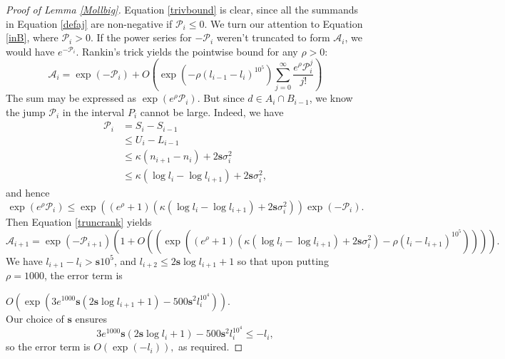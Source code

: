 \documentclass[12pt]{amsart}
\numberwithin{equation}{section}
\numberwithin{thm}{section}
\newcommand{\1}{\mathbf 1}
\begin{document}
\begin{proof}[Proof of Lemma \ref{Mollbig}]
	Equation \eqref{trivbound} is clear, since all the summands in Equation \eqref{defaj} are non-negative if $\mathscr{P}_{i}\le 0.$  We turn our attention to Equation \eqref{inB}, where $\mathscr{P}_i>0$. If the power series for $-\mathscr{P}_{i}$ weren't truncated to form $\mathscr{A}_{i}$, we would have $e^{-\mathscr{P}_{i}}$.  Rankin's trick yields the pointwise bound for any $\rho>0:$
	\begin{equation}\label{truncrank}
		\mathscr{A}_{i}=\exp(-\mathscr{P}_{i})+O\left(\exp\left(-\rho (l_{i-1}-l_i)^{10^5}\right)\sum^\infty_{j=0} \frac{e^\rho \mathscr{P}_{i}^j}{j!}\right)
		\end{equation}
		The sum may be expressed as $\exp\left(e^\rho \mathscr{P}_{i}\right)$. But since $d\in A_{i}\cap B_{i-1}$, we know the jump $\mathscr{P}_{i}$ in the interval $P_{i}$ cannot be large. Indeed, we  have \begin{align}\nonumber\mathscr{P}_{i}&= S_{i}-S_{{i-1}}\\&\le U_{i}-L_{i-1}\nonumber\\\nonumber&\le \kappa\left(n_{i+1}-n_{i}\right)+2\mathbf{s}\sigma^2_{i}\\&\le\kappa\left( \log l_{i}-\log l_{i+1}\right)+2\mathbf{s}\sigma^2_{i},\end{align}  
			 and hence 		
		\begin{equation}
			\exp\left(e^\rho \mathscr{P}_{i}\right)\le \exp((e^\rho+1)(\kappa\left( \log l_{i}-\log l_{i+1}\right)+2\mathbf{s}\sigma^2_{i}))\exp(-\mathscr{P}_{i}). 
		\end{equation} 
		Then Equation \eqref{truncrank} yields
		\begin{equation}\mathscr{A}_{i+1}=\exp(-\mathscr{P}_{i+1}) \left(1+O\left(\left(\exp((e^\rho+1)(\kappa\left( \log l_{i}-\log l_{i+1}\right)+2\mathbf{s}\sigma^2_{i})-\rho (l_{i}-l_{i+1})^{10^5})\right)\right)\right).\end{equation}
	We have $l_{i+1}-l_i>\mathbf{s}10^5$, and $l_{i+2}\le 2\mathbf{s}\log l_{i+1}+1$  so that upon putting $\rho=1000$, the error term is
	
	$O\left(\exp(3e^{1000}\mathbf{s}(2\mathbf{s}\log l_{i+1}+1)-500\mathbf{s}^2 l_{i}^{10^4})\right).$\\
	Our choice of $\mathbf{s}$ ensures
	\begin{equation}\label{bound2}
		3e^{1000}\mathbf{s}(2\mathbf{s}\log l_{i}+1)-500\mathbf{s}^2 l_{i}^{10^4}\le-l_i,
\end{equation}
so the error term is $O(\exp(-l_i)),$ as required. 
\end{proof}
\end{document}
